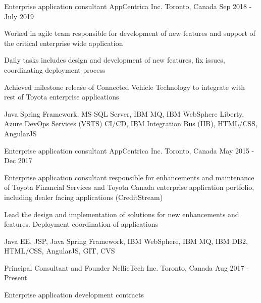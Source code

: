 \begin{cventries}


  \cventry
    {Enterprise application consultant}
    {AppCentrica Inc.}
    {Toronto, Canada}
    {Sep 2018 - July 2019}
    {
      \begin{cvitems}
      	\item{Worked in agile team responsible for development of new features and support of the critical enterprise wide application }
      	\item{Daily tasks includes design and development of new features, fix issues, coordinating deployment process }
      	\item{Achieved milestone release of Connected Vehicle Technology to integrate with rest of Toyota enterprise applications }
       \item {Java Spring Framework, MS SQL Server, IBM MQ, IBM WebSphere Liberty, Azure DevOps Services (VSTS) CI/CD, IBM Integration Bus (IIB), HTML/CSS, AngularJS}
      \end{cvitems}
    }
    


  \cventry
    {Enterprise application consultant}
    {AppCentrica Inc.}
    {Toronto, Canada}
    {May 2015 - Dec 2017}
    {
      \begin{cvitems}
      	\item{Enterprise application consultant responsible for enhancements and maintenance of Toyota Financial Services and Toyota Canada enterprise application portfolio, including dealer facing applications (CreditStream)}
        \item {Lead the design and implementation of solutions for new enhancements and features. Deployment coordination of applications}
        \item {Java EE, JSP, Java Spring Framework, IBM WebSphere, IBM MQ, IBM DB2, HTML/CSS, AngularJS, GIT, CVS  }
      \end{cvitems}
    }

  \cventry
    {Principal Consultant and Founder}
    {NellieTech Inc.}
    {Toronto, Canada}
    {Aug 2017 - Present}
    {
      \begin{cvitems}
        \item{Enterprise application development contracts}
      \end{cvitems}
    }
    

\end{cventries}
